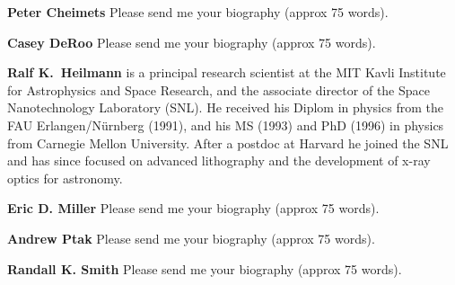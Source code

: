 \documentclass[12pt]{spieman}  %
\begin{document}
\begin{spacing}{1}
\vspace{1ex}
\vspace{2ex}\noindent\textbf{Peter Cheimets}
Please send me your biography (approx 75 words).

\vspace{1ex}
\vspace{2ex}\noindent\textbf{Casey DeRoo}
Please send me your biography (approx 75 words).

\vspace{1ex}
\vspace{2ex}\noindent\textbf{Ralf K.~Heilmann} is a principal research scientist at the MIT Kavli Institute for Astrophysics and Space Research, and the associate director of the Space Nanotechnology Laboratory (SNL).  He received his Diplom in physics from the FAU Erlangen/N\"urnberg (1991), and his MS (1993) and PhD (1996) in physics from Carnegie Mellon University.  After a postdoc at Harvard he joined the SNL and has since focused on advanced lithography and the development of x-ray optics for astronomy.

\vspace{1ex}
\vspace{2ex}\noindent\textbf{Eric D. Miller}
Please send me your biography (approx 75 words).

\vspace{1ex}
\vspace{2ex}\noindent\textbf{Andrew Ptak}
Please send me your biography (approx 75 words).

\vspace{1ex}
\vspace{2ex}\noindent\textbf{Randall K. Smith}
Please send me your biography (approx 75 words).







\end{spacing}
\end{document}
